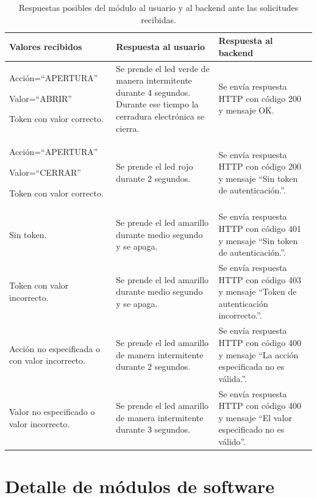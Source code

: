 \begin{table}[h]
	\centering
	\caption[Respuestas posibles del módulo al usuario y al backend ante las solicitudes recibidas]{Respuestas posibles del módulo al usuario y al backend ante las solicitudes recibidas.}
	\begin{tabular}{p{4cm} p{4.5cm} p{4.5cm} } 	

		\toprule
		\textbf{Valores recibidos} & 
		\textbf{Respuesta al usuario} &
		\textbf{Respuesta al backend} 
		\\
		\midrule

Acción=``APERTURA''

Valor=``ABRIR''

Token con valor correcto.& Se prende el led verde de manera intermitente durante 4 segundos. Durante ese tiempo la cerradura electrónica se cierra. & Se envía respuesta HTTP con código 200 y mensaje OK. \\
Acción=``APERTURA''

Valor=``CERRAR''

Token con valor correcto. & Se prende el led rojo durante 2 segundos. & Se envía respuesta HTTP con código 200 y mensaje ``Sin token de autenticación.''. \\
Sin token. & Se prende el led amarillo  durante medio segundo y se apaga. & Se envía respuesta HTTP con código 401 y mensaje ``Sin token de autenticación.''. \\
Token con valor incorrecto. & Se prende el led amarillo  durante medio segundo y se apaga. & Se envía respuesta HTTP con código 403 y mensaje ``Token de autenticación incorrecto.''. \\
Acción no especificada o con valor incorrecto. & Se prende el led amarillo de manera intermitente durante 2 segundos. & Se envía respuesta HTTP con código 400 y mensaje ``La acción especificada no es válida.''. \\
Valor no especificado o valor incorrecto. & Se prende el led amarillo de manera intermitente durante 3 segundos. & Se envía respuesta HTTP con código 400 y mensaje ``El valor especificado no es válido''. \\
		\bottomrule
		\hline
	\end{tabular}
	\label{tab:respuestasActuadorBackend}
\end{table}

\pagebreak
\section{Detalle de módulos de software}

